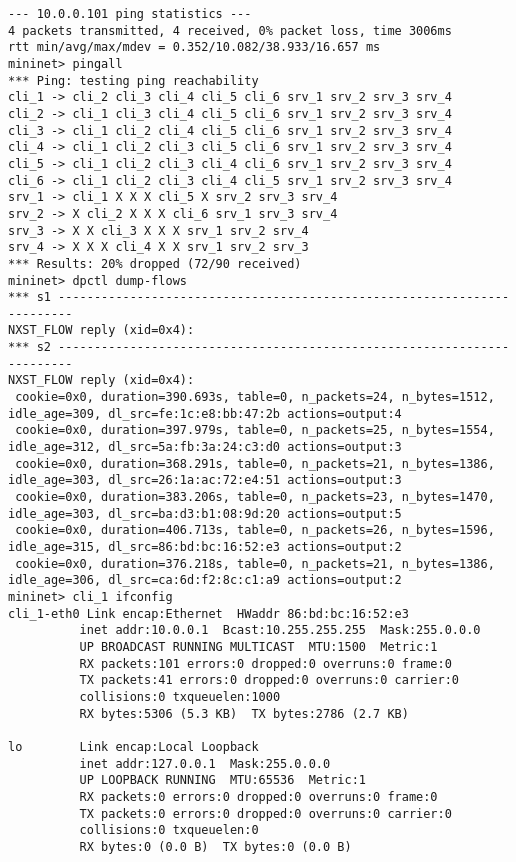 \documentclass{article}
\begin{document}
\begin{Verbatim}
--- 10.0.0.101 ping statistics ---
4 packets transmitted, 4 received, 0% packet loss, time 3006ms
rtt min/avg/max/mdev = 0.352/10.082/38.933/16.657 ms
mininet> pingall
*** Ping: testing ping reachability
cli_1 -> cli_2 cli_3 cli_4 cli_5 cli_6 srv_1 srv_2 srv_3 srv_4
cli_2 -> cli_1 cli_3 cli_4 cli_5 cli_6 srv_1 srv_2 srv_3 srv_4
cli_3 -> cli_1 cli_2 cli_4 cli_5 cli_6 srv_1 srv_2 srv_3 srv_4
cli_4 -> cli_1 cli_2 cli_3 cli_5 cli_6 srv_1 srv_2 srv_3 srv_4
cli_5 -> cli_1 cli_2 cli_3 cli_4 cli_6 srv_1 srv_2 srv_3 srv_4
cli_6 -> cli_1 cli_2 cli_3 cli_4 cli_5 srv_1 srv_2 srv_3 srv_4
srv_1 -> cli_1 X X X cli_5 X srv_2 srv_3 srv_4
srv_2 -> X cli_2 X X X cli_6 srv_1 srv_3 srv_4
srv_3 -> X X cli_3 X X X srv_1 srv_2 srv_4
srv_4 -> X X X cli_4 X X srv_1 srv_2 srv_3
*** Results: 20% dropped (72/90 received)
mininet> dpctl dump-flows
*** s1 ------------------------------------------------------------------------
NXST_FLOW reply (xid=0x4):
*** s2 ------------------------------------------------------------------------
NXST_FLOW reply (xid=0x4):
 cookie=0x0, duration=390.693s, table=0, n_packets=24, n_bytes=1512, idle_age=309, dl_src=fe:1c:e8:bb:47:2b actions=output:4
 cookie=0x0, duration=397.979s, table=0, n_packets=25, n_bytes=1554, idle_age=312, dl_src=5a:fb:3a:24:c3:d0 actions=output:3
 cookie=0x0, duration=368.291s, table=0, n_packets=21, n_bytes=1386, idle_age=303, dl_src=26:1a:ac:72:e4:51 actions=output:3
 cookie=0x0, duration=383.206s, table=0, n_packets=23, n_bytes=1470, idle_age=303, dl_src=ba:d3:b1:08:9d:20 actions=output:5
 cookie=0x0, duration=406.713s, table=0, n_packets=26, n_bytes=1596, idle_age=315, dl_src=86:bd:bc:16:52:e3 actions=output:2
 cookie=0x0, duration=376.218s, table=0, n_packets=21, n_bytes=1386, idle_age=306, dl_src=ca:6d:f2:8c:c1:a9 actions=output:2
mininet> cli_1 ifconfig
cli_1-eth0 Link encap:Ethernet  HWaddr 86:bd:bc:16:52:e3
          inet addr:10.0.0.1  Bcast:10.255.255.255  Mask:255.0.0.0
          UP BROADCAST RUNNING MULTICAST  MTU:1500  Metric:1
          RX packets:101 errors:0 dropped:0 overruns:0 frame:0
          TX packets:41 errors:0 dropped:0 overruns:0 carrier:0
          collisions:0 txqueuelen:1000
          RX bytes:5306 (5.3 KB)  TX bytes:2786 (2.7 KB)

lo        Link encap:Local Loopback
          inet addr:127.0.0.1  Mask:255.0.0.0
          UP LOOPBACK RUNNING  MTU:65536  Metric:1
          RX packets:0 errors:0 dropped:0 overruns:0 frame:0
          TX packets:0 errors:0 dropped:0 overruns:0 carrier:0
          collisions:0 txqueuelen:0
          RX bytes:0 (0.0 B)  TX bytes:0 (0.0 B)


\end{Verbatim}
\end{document}
